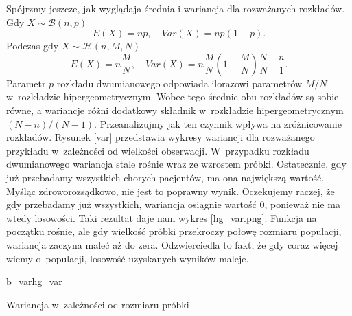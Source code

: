 Spójrzmy jeszcze, jak wyglądaja średnia i wariancja dla rozważanych rozkładów. \newline
Gdy $X\sim\mathcal{B}(n,p)$
\begin{equation}
E(X)=np,\quad Var(X)=np(1-p).
\end{equation}
Podczas gdy $X\sim\mathcal{H}(n,M,N)$
\begin{equation}
E(X)=n\frac{M}{N},\quad Var(X)=n\frac{M}{N}\left(1-\frac{M}{N}\right)\frac{N-n}{N-1}.
\end{equation}
Parametr $p$ rozkładu dwumianowego odpowiada ilorazowi parametrów $M/N$ w~rozkładzie hipergeometrycznym. Wobec tego średnie obu rozkładów są sobie równe, a wariancje różni dodatkowy składnik w~rozkładzie hipergeometrycznym $(N-n)/(N-1)$. Przeanalizujmy jak ten czynnik wpływa na zróżnicowanie rozkładów. Rysunek \ref{var} przedstawia wykresy wariancji dla rozważanego przykładu w~zależności od wielkości obserwacji. W~przypadku rozkładu dwumianowego wariancja stale rośnie wraz ze wzrostem próbki. Ostatecznie, gdy już przebadamy wszystkich chorych pacjentów, ma ona największą wartość. Myśląc zdroworozsądkowo, nie jest to poprawny wynik. Oczekujemy raczej, że gdy przebadamy już wszystkich, wariancja osiągnie wartość $0$, ponieważ nie ma wtedy losowości. Taki rezultat daje nam wykres \ref{hg_var.png}. Funkcja na początku rośnie, ale gdy wielkość próbki przekroczy połowę rozmiaru populacji, wariancja zaczyna maleć aż do zera. Odzwierciedla to fakt, że gdy coraz więcej wiemy o~populacji, losowość uzyskanych wyników maleje.

\begin{diagrams}{b_var}{hg_var}
	\caption{Wariancja w~zależności od rozmiaru próbki}
	\label{var}
\end{diagrams}